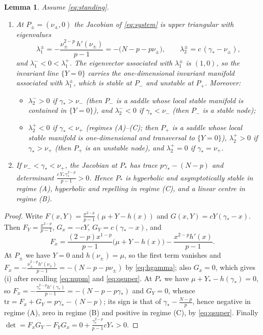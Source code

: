 \documentclass[11pt,reqno]{amsart}
\numberwithin{equation}{section}
\theoremstyle{plain}
\newtheorem{lemma}[theorem]{Lemma}
\theoremstyle{definition}
\newcommand{\gs}{\gamma_{*}}
\begin{document}
\begin{lemma}\label{lem:linear}
Assume \eqref{eq:standing}.
\begin{enumerate}
\item[(i)] At $P_{\pm}=(\nu_{\pm},0)$ the Jacobian of \eqref{eq:system} is upper
triangular with eigenvalues
\[
\lambda_{1}^{\pm}=-\frac{\nu_{\pm}^{2-p}\,h'(\nu_{\pm})}{p-1}
=-\big(N-p-p\nu_{\pm}\big),
\qquad
\lambda_{2}^{\pm}=c\,(\gs-\nu_{\pm}) ,
\]
and $\lambda_{1}^{-}<0<\lambda_{1}^{+}$. The eigenvector associated with
$\lambda_{1}^{\pm}$ is $(1,0)$, so the invariant line $\{Y=0\}$ carries the
one-dimensional invariant manifold associated with $\lambda_{1}^{\pm}$, which
is stable at $P_{-}$ and unstable at $P_{+}$. Moreover:
\begin{itemize}
\item $\lambda_{2}^{-}>0$ if $\gs>\nu_{-}$ (then $P_{-}$ is a saddle whose local
stable manifold is contained in $\{Y=0\}$), and $\lambda_{2}^{-}<0$ if
$\gs<\nu_{-}$ (then $P_{-}$ is a stable node);
\item $\lambda_{2}^{+}<0$ if $\gs<\nu_{+}$ (regimes {\rm(A)--(C)}; then $P_{+}$
is a saddle whose local stable manifold is one-dimensional and transversal to
$\{Y=0\}$), $\lambda_{2}^{+}>0$ if $\gs>\nu_{+}$ (then $P_{+}$ is an unstable
node), and $\lambda_{2}^{+}=0$ if $\gs=\nu_{+}$.
\end{itemize}
\item[(ii)] If $\nu_{-}<\gs<\nu_{+}$, the Jacobian at $P_{*}$ has trace
$p\gs-(N-p)$ and determinant $\frac{c\,Y_{*}\gs^{2-p}}{p-1}>0$. Hence $P_{*}$ is
hyperbolic and asymptotically stable in regime {\rm(A)}, hyperbolic and
repelling in regime {\rm(C)}, and a linear centre in regime {\rm(B)}.
\end{enumerate}
\end{lemma}

\begin{proof}
Write $F(x,Y)=\frac{x^{2-p}}{p-1}(\mu+Y-h(x))$ and
$G(x,Y)=cY(\gs-x)$. Then
$F_{Y}=\frac{x^{2-p}}{p-1}$, $G_{x}=-cY$, $G_{Y}=c(\gs-x)$, and
\[
F_{x}=\frac{(2-p)x^{1-p}}{p-1}\big(\mu+Y-h(x)\big)-\frac{x^{2-p}h'(x)}{p-1}.
\]
At $P_{\pm}$ we have $Y=0$ and $h(\nu_{\pm})=\mu$, so the first term vanishes
and $F_{x}=-\frac{\nu_{\pm}^{2-p}h'(\nu_{\pm})}{p-1}
=-(N-p-p\nu_{\pm})$ by \eqref{eq:hgamma}; also $G_{x}=0$, which gives (i)
after recalling \eqref{eq:nupm} and \eqref{eq:qsuper}. At $P_{*}$ we have
$\mu+Y_{*}-h(\gs)=0$, so $F_{x}=-\frac{\gs^{2-p}h'(\gs)}{p-1}=-(N-p-p\gs)$ and
$G_{Y}=0$, whence $\mathrm{tr}=F_{x}+G_{Y}=p\gs-(N-p)$; its sign is that of
$\gs-\frac{N-p}{p}$, hence negative in regime {\rm(A)}, zero in regime {\rm(B)}
and positive in regime {\rm(C)}, by \eqref{eq:qsuper}. Finally
$\det=F_{x}G_{Y}-F_{Y}G_{x}=0+\frac{\gs^{2-p}}{p-1}cY_{*}>0$.
\end{proof}
\end{document}
